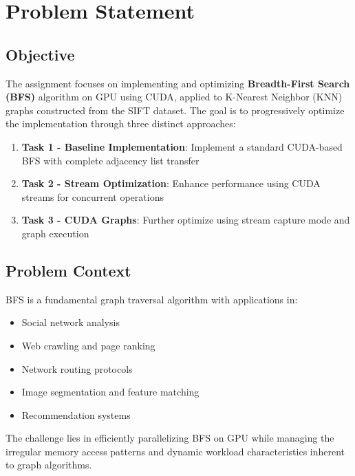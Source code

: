 \documentclass[11pt,a4paper]{article}
\begin{document}
\tableofcontents
\newpage

\section{Problem Statement}

\subsection{Objective}

The assignment focuses on implementing and optimizing \textbf{Breadth-First Search (BFS)} algorithm on GPU using CUDA, applied to K-Nearest Neighbor (KNN) graphs constructed from the SIFT dataset. The goal is to progressively optimize the implementation through three distinct approaches:

\begin{enumerate}
    \item \textbf{Task 1 - Baseline Implementation}: Implement a standard CUDA-based BFS with complete adjacency list transfer
    \item \textbf{Task 2 - Stream Optimization}: Enhance performance using CUDA streams for concurrent operations
    \item \textbf{Task 3 - CUDA Graphs}: Further optimize using stream capture mode and graph execution
\end{enumerate}

\subsection{Problem Context}

BFS is a fundamental graph traversal algorithm with applications in:
\begin{itemize}
    \item Social network analysis
    \item Web crawling and page ranking
    \item Network routing protocols
    \item Image segmentation and feature matching
    \item Recommendation systems
\end{itemize}

The challenge lies in efficiently parallelizing BFS on GPU while managing the irregular memory access patterns and dynamic workload characteristics inherent to graph algorithms.
\end{document}
